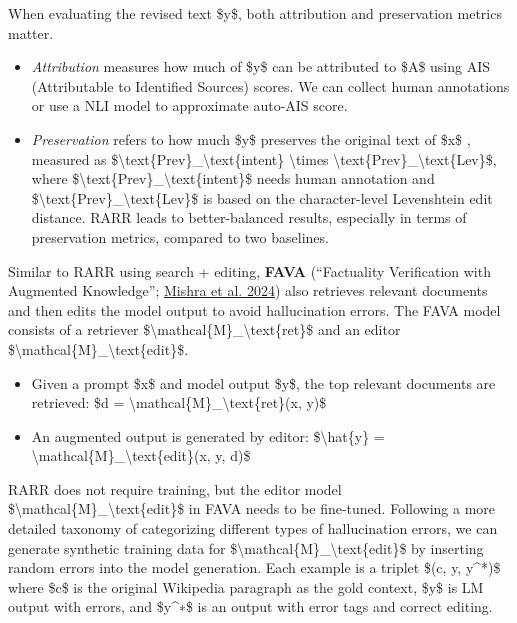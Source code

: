 When evaluating the revised text \$y\$, both attribution and preservation metrics matter.

\begin{itemize}
\tightlist
\item
  \emph{Attribution} measures how much of \$y\$ can be attributed to \$A\$ using AIS (Attributable to Identified Sources) scores. We can collect human annotations or use a NLI model to approximate auto-AIS score.
\item
  \emph{Preservation} refers to how much \$y\$ preserves the original text of \$x\$ , measured as \$\textbackslash text\{Prev\}\_\textbackslash text\{intent\} \textbackslash times \textbackslash text\{Prev\}\_\textbackslash text\{Lev\}\$, where \$\textbackslash text\{Prev\}\_\textbackslash text\{intent\}\$ needs human annotation and \$\textbackslash text\{Prev\}\_\textbackslash text\{Lev\}\$ is based on the character-level Levenshtein edit distance. RARR leads to better-balanced results, especially in terms of preservation metrics, compared to two baselines.
\end{itemize}

Similar to RARR using search + editing, \textbf{FAVA} (``Factuality Verification with Augmented Knowledge''; \href{https://arxiv.org/abs/2401.06855}{Mishra et al. 2024}) also retrieves relevant documents and then edits the model output to avoid hallucination errors. The FAVA model consists of a retriever \$\textbackslash mathcal\{M\}\_\textbackslash text\{ret\}\$ and an editor \$\textbackslash mathcal\{M\}\_\textbackslash text\{edit\}\$.

\begin{itemize}
\tightlist
\item
  Given a prompt \$x\$ and model output \$y\$, the top relevant documents are retrieved: \$d = \textbackslash mathcal\{M\}\_\textbackslash text\{ret\}(x, y)\$
\item
  An augmented output is generated by editor: \$\textbackslash hat\{y\} = \textbackslash mathcal\{M\}\_\textbackslash text\{edit\}(x, y, d)\$
\end{itemize}

RARR does not require training, but the editor model \$\textbackslash mathcal\{M\}\_\textbackslash text\{edit\}\$ in FAVA needs to be fine-tuned. Following a more detailed taxonomy of categorizing different types of hallucination errors, we can generate synthetic training data for \$\textbackslash mathcal\{M\}\_\textbackslash text\{edit\}\$ by inserting random errors into the model generation. Each example is a triplet \$(c, y, y\^{}*)\$ where \$c\$ is the original Wikipedia paragraph as the gold context, \$y\$ is LM output with errors, and \$y\^{}∗\$ is an output with error tags and correct editing.

